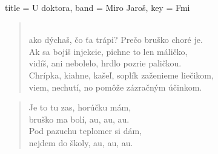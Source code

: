 \begin{song}[
    remember-chords = true ,
    verse/numbered = true ,
    transpose-capo = true 
  ]{
    title = U doktora,
    band = Miro Jaroš,
    key  = Fmi
  }
\begin{verse}
\\ ako dýchaš, čo ťa trápi? Prečo bruško choré je. \\
Ak sa bojíš injekcie, pichne to len máličko, \\vidíš, ani nebolelo, hrdlo pozrie paličkou. \\ Chrípka, kiahne, kašeľ, soplík zaženieme liečikom,\\ viem, nechutí, no pomôže zázračným účinkom.
  \end{verse}
  \begin{verse}
  Je to tu zas, horúčku mám, \\ bruško ma bolí, au, au, au.\\ Pod pazuchu teplomer si dám, \\ nejdem do školy, au, au, au.
  \end{verse}
  \begin{chorus}
  
  \end{chorus}
\end{song}